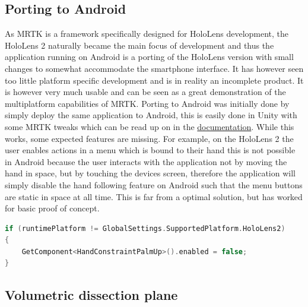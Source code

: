 \subsection{Porting to Android}

As MRTK is a framework specifically designed for HoloLens development, the HoloLens 2 naturally became the main focus of development and thus the application running on Android is a porting of the HoloLens version with small changes to somewhat accommodate the smartphone interface. It has however seen too little platform specific development and is in reality an incomplete product. It is however very much usable and can be seen as a great demonstration of the multiplatform capabilities of MRTK. 
Porting to Android was initially done by simply deploy the same application to Android, this is easily done in Unity with some MRTK tweaks which can be read up on in the \href{https://microsoft.github.io/MixedRealityToolkit-Unity/version/releases/2.2.0/Documentation/CrossPlatform/UsingARFoundation.html}{documentation}. While this works, some expected features are missing. For example, on the HoloLens 2 the user enables actions in a menu which is bound to their hand this is not possible in Android because the user interacts with the application not by moving the hand in space, but by touching the devices screen, therefore the application will simply disable the hand following feature on Android such that the menu buttons are static in space at all time. This is far from a optimal solution, but has worked for basic proof of concept. 
\begin{lstlisting}[language=c, caption={Basic example of separate features per device.}, label={item:androidcode}]
if (runtimePlatform != GlobalSettings.SupportedPlatform.HoloLens2)
{
    GetComponent<HandConstraintPalmUp>().enabled = false;
}
\end{lstlisting}



\subsection{Volumetric dissection plane}\label{chap:dissect}

